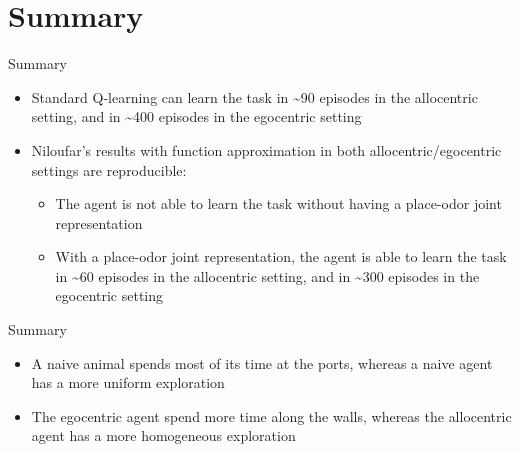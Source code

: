 \documentclass[bigger]{beamer}
\begin{document}
\section{Summary}
\label{sec:org654fb2b}
\begin{frame}[<+->][label={sec:orgf04f1a6}]{Summary}
\begin{itemize}
\item Standard Q-learning can learn the task in \textasciitilde{}90 episodes in the \alert{allocentric} setting, and in \textasciitilde{}400 episodes in the \alert{egocentric} setting
\item Niloufar's results with function approximation in both allocentric/egocentric settings are \alert{reproducible}:
\begin{itemize}
\item The agent is \alert{not able to learn} the task \alert{without} having a place-odor joint representation
\item \alert{With} a place-odor joint representation, the agent is \alert{able to learn the task} in \textasciitilde{}60 episodes in the allocentric setting, and in \textasciitilde{}300 episodes in the egocentric setting
\end{itemize}
\end{itemize}
\end{frame}
\begin{frame}[<+->][label={sec:org1fa7639}]{Summary}
\begin{itemize}
\item A naive \alert{animal} spends most of its time at the ports, whereas a naive \alert{agent} has a more uniform exploration
\item The \alert{egocentric} agent spend more time along the \alert{walls}, whereas the \alert{allocentric} agent has a more \alert{homogeneous} exploration
\end{itemize}
\end{frame}
\end{document}
